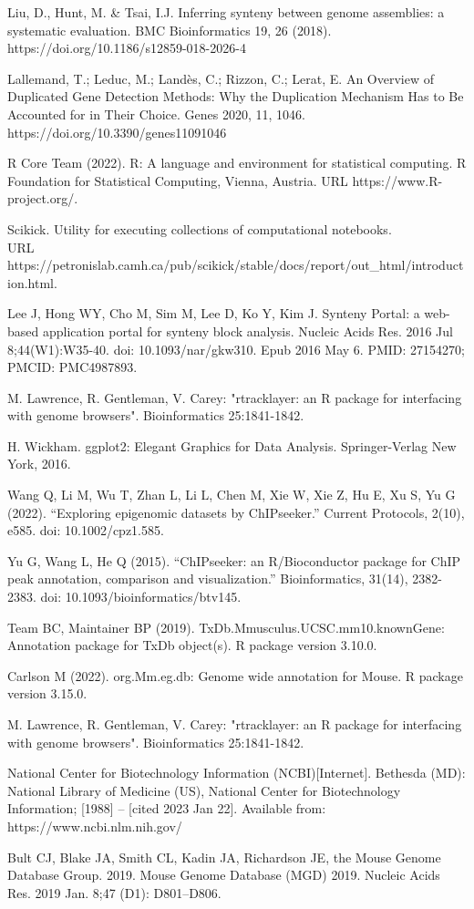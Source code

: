 \documentclass[12pt]{article}
\begin{document}
\begin{thebibliography}{99}
 Liu, D., Hunt, M. \& Tsai, I.J. Inferring synteny between
genome assemblies: a systematic evaluation. BMC Bioinformatics 19, 26 (2018).
https://doi.org/10.1186/s12859-018-2026-4

 Lallemand, T.; Leduc, M.; Landès, C.; Rizzon, C.; Lerat, E.
An Overview of Duplicated Gene Detection Methods: Why the Duplication Mechanism
Has to Be Accounted for in Their Choice. Genes 2020, 11, 1046.
https://doi.org/10.3390/genes11091046

 R Core Team (2022).
R: A language and environment for statistical computing. R Foundation
for Statistical Computing, Vienna, Austria. URL https://www.R-project.org/.

 Scikick. Utility for executing collections of computational
notebooks.\\
URL https://petronislab.camh.ca/pub/scikick/stable/docs/report/out\_html/introduction.html.

 Lee J, Hong WY, Cho M, Sim M, Lee D, Ko Y, Kim J. Synteny
Portal: a web-based application portal for synteny block analysis. Nucleic
Acids Res. 2016 Jul 8;44(W1):W35-40. doi: 10.1093/nar/gkw310. Epub 2016 May 6.
PMID: 27154270; PMCID: PMC4987893.

 M. Lawrence, R. Gentleman, V. Carey: "rtracklayer: an {R}
package for interfacing with genome browsers". Bioinformatics 25:1841-1842.

 H. Wickham. ggplot2: Elegant Graphics for Data Analysis.
Springer-Verlag New York, 2016.

 Wang Q, Li M, Wu T, Zhan L, Li L, Chen M, Xie W, Xie Z, Hu E,
Xu S, Yu G (2022). “Exploring epigenomic datasets by ChIPseeker.” Current
Protocols, 2(10), e585. doi: 10.1002/cpz1.585.

 Yu G, Wang L, He Q (2015). “ChIPseeker: an R/Bioconductor
package for ChIP peak annotation, comparison and visualization.”
Bioinformatics, 31(14), 2382-2383. doi: 10.1093/bioinformatics/btv145.

 Team BC, Maintainer BP (2019).
TxDb.Mmusculus.UCSC.mm10.knownGene: Annotation package for TxDb object(s).
R package version 3.10.0.

 Carlson M (2022). org.Mm.eg.db: Genome wide annotation for
Mouse. R package version 3.15.0.

 M. Lawrence, R. Gentleman, V. Carey: "rtracklayer: an {R}
package for interfacing with genome browsers". Bioinformatics 25:1841-1842.

 National Center for Biotechnology Information (NCBI)[Internet].
Bethesda (MD): National Library of Medicine (US), National Center for
Biotechnology Information; [1988] – [cited 2023 Jan 22]. Available from:
https://www.ncbi.nlm.nih.gov/

 Bult CJ, Blake JA, Smith CL, Kadin JA, Richardson JE, the
Mouse Genome Database Group. 2019. Mouse Genome Database (MGD) 2019.
Nucleic Acids Res. 2019 Jan. 8;47 (D1): D801–D806.
\end{thebibliography}
\end{document}
